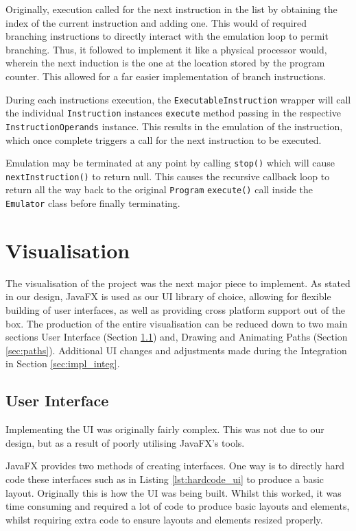 Originally, execution called for the next instruction in the list by obtaining the index of the current instruction and adding one. This would of required branching instructions to directly interact with the emulation loop to permit branching. Thus, it followed to implement it like a physical processor would, wherein the next induction is the one at the location stored by the program counter. This allowed for a far easier implementation of branch instructions.

During each instructions execution, the \texttt{ExecutableInstruction} wrapper will call the individual \texttt{Instruction} instances \verb|execute| method passing in the respective \texttt{InstructionOperands} instance. This results in the emulation of the instruction, which once complete triggers a call for the next instruction to be executed.

Emulation may be terminated at any point by calling \verb|stop()| which will cause \verb|nextInstruction()| to return null. This causes the recursive callback loop to return all the way back to the original \texttt{Program} \verb|execute()| call inside the \texttt{Emulator} class before finally terminating.

\section{Visualisation}\label{sec:impl_vis}
The visualisation of the project was the next major piece to implement. As stated in our design, JavaFX \cite{sunmicrosystems_2022_javafx} is used as our \ac{UI} library of choice, allowing for flexible building of user interfaces, as well as providing cross platform support out of the box. The production of the entire visualisation can be reduced down to two main sections User Interface (Section \ref{sec:ui}) and, Drawing and Animating Paths (Section \ref{sec:paths}). Additional \ac{UI} changes and adjustments made during the Integration in Section \ref{sec:impl_integ}.

\subsection{User Interface}\label{sec:ui}
Implementing the \ac{UI} was originally fairly complex. This was not due to our design, but as a result of poorly utilising JavaFX's \cite{sunmicrosystems_2022_javafx} tools. 

JavaFX \cite{sunmicrosystems_2022_javafx} provides two methods of creating interfaces. One way is to directly hard code these interfaces such as in Listing \ref{lst:hardcode_ui} to produce a basic layout. Originally this is how the \ac{UI} was being built. Whilst this worked, it was time consuming and required a lot of code to produce basic layouts and elements, whilst requiring extra code to ensure layouts and elements resized properly.

